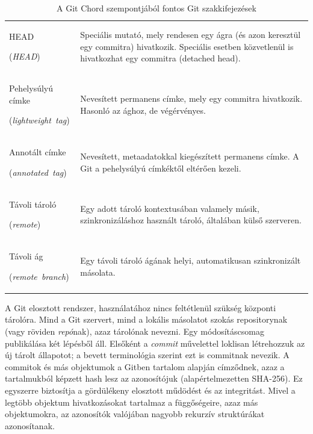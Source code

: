 \documentclass[
]{elteikthesis}[2025/03/25]
\begin{document}
\begin{table}[p]
\begin{tabularx}{\textwidth}{L{3.35cm}@{\hspace{6pt}}Y}
\addlinespace
HEAD \par(\textit{HEAD}) &
Speciális mutató, mely rendesen egy ágra (és azon keresztül egy commitra) hivatkozik.
Speciális esetben közvetlenül is hivatkozhat egy commitra (detached head). \\
\addlinespace
Pehelysúlyú címke \par(\textit{lightweight~tag}) &
Nevesített permanens címke, mely egy commitra hivatkozik.
Hasonló az ághoz, de végérvényes. \\
\addlinespace
Annotált címke \par(\textit{annotated~tag}) &
Nevesített, metaadatokkal kiegészített permanens címke.
A Git a pehelysúlyú címkéktől eltérően kezeli. \\
\addlinespace
Távoli tároló \par(\textit{remote}) &
Egy adott tároló kontextusában valamely másik, szinkronizáláshoz használt tároló,
általában külső szerveren. \\
\addlinespace
Távoli ág \par(\textit{remote~branch}) &
Egy távoli tároló ágának helyi, automatikusan szinkronizált másolata. \\
\bottomrule
\end{tabularx}
\caption{A Git Chord szempontjából fontos Git szakkifejezések}
\label{tab:git-terminologia}
\end{table}

A Git elosztott rendszer,
használatához nincs feltétlenül szükség központi tárolóra.
Mind a Git szervert, mind a lokális másolatot szokás repositorynak (vagy röviden \textit{repó}nak), azaz tárolónak nevezni.
Egy módosításcsomag publikálása két lépésből áll.
Elsőként a \textit{commit} művelettel loklisan létrehozzuk az új tárolt állapotot;
a bevett terminológia szerint ezt is commitnak nevezik.
A commitok és más objektumok a Gitben tartalom alapján címződnek,
azaz a tartalmukból képzett hash lesz az azonosítójuk
(alapértelmezetten SHA-256).
Ez egyszerre biztosítja a gördülékeny elosztott műdödést és az integritást.
Mivel a legtöbb objektum hivatkozásokat tartalmaz a függőségeire, azaz más objektumokra,
az azonosítók valójában nagyobb rekurzív struktúrákat azonosítanak.
\end{document}

